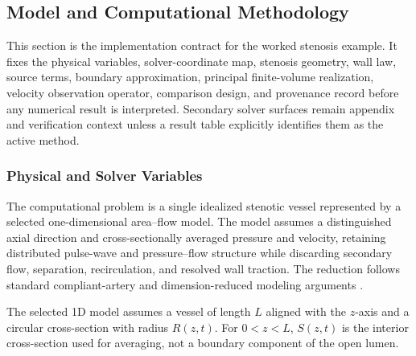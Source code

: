 \subsection{Model and Computational Methodology}
\label{sec:methodology}

This section is the implementation contract for the worked stenosis example. It
fixes the physical variables, solver-coordinate map, stenosis geometry, wall
law, source terms, boundary approximation, principal finite-volume realization,
velocity observation operator, comparison design, and provenance record before
any numerical result is interpreted. Secondary solver surfaces remain appendix
and verification context unless a result table explicitly identifies them as the
active method.

\subsubsection{Physical and Solver Variables}
\label{subsec:methodology-problem-definition}
\label{subsec:selected-1d-forward-model}
\label{subsec:cross-sectional-variables-governing-equations}
\label{subsubsec:cross-sectional-reduction-selected-1d-model}

The computational problem is a single idealized stenotic vessel represented by a
selected one-dimensional area--flow model. The model assumes a distinguished
axial direction and cross-sectionally averaged pressure and velocity, retaining
distributed pulse-wave and pressure--flow structure while discarding secondary
flow, separation, recirculation, and resolved wall traction. The reduction
follows standard compliant-artery and dimension-reduced modeling arguments
\cite[Sec.~2, pp.~253--257]{FormaggiaEtAl2003OneDimensionalBloodFlow}
\cite[Ch.~3, Secs.~3.2 and~3.6]{KopplHelmig2023DimensionReducedModeling}
\cite[Sec.~3, pp.~24--26]{ShiEtAl2011BloodFlowModelReview}.

\begin{assumption}
    \label{ass:1d-straight-vessel-geometry}
    The selected 1D model assumes a vessel of length $L$ aligned with the
    $z$-axis and a circular cross-section with radius $R(z,t)$. For
    $0<z<L$, $S(z,t)$ is the interior cross-section used for averaging, not
    a boundary component of the open lumen.
\end{assumption}

